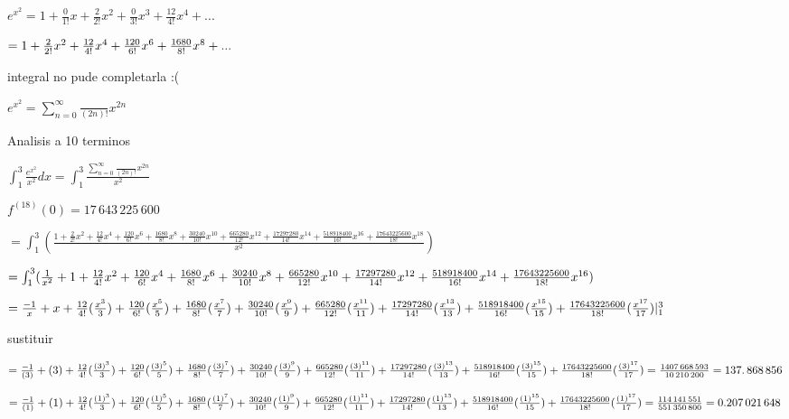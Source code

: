 \documentclass{article}
\begin{document}
$e^{x^{2}}=1+\frac{0}{1!}x+\frac{2}{2!}x^{2}+\frac{0}{3!}x^{3}+\frac{12}{4!}%
x^{4}+...$

\qquad $=1+\frac{2}{2!}x^{2}+\frac{12}{4!}x^{4}+\frac{120}{6!}x^{6}+\frac{%
1680}{8!}x^{8}+...$

integral no pude completarla :( 

$e^{x^{2}}=\sum_{n=0}^{\infty }\frac{{}}{(2n)!}x^{2n}$\newline

Analisis a 10 terminos

$\int_{1}^{3}\frac{e^{x^{2}}}{x^{2}}dx=\int_{1}^{3}\frac{\sum_{n=0}^{\infty }%
\frac{{}}{(2n)!}x^{2n}}{x^{2}}$

\bigskip $f^{(18)}(0)=\allowbreak 17\,\allowbreak 643\,225\,600$

$=\int_{1}^{3}(\frac{1+\frac{2}{2!}x^{2}+\frac{12}{4!}x^{4}+\frac{120}{6!}%
x^{6}+\frac{1680}{8!}x^{8}+\frac{30240}{10!}x^{10}+\frac{665280}{12!}x^{12}+%
\frac{17297280}{14!}x^{14}+\frac{518918400}{16!}x^{16}+\frac{17643225600}{18!%
}x^{18}}{x^{2}})$

$=\int_{1}^{3}(\frac{1}{x^{2}}+1+\frac{12}{4!}x^{2}+\frac{120}{6!}x^{4}+%
\frac{1680}{8!}x^{6}+\frac{30240}{10!}x^{8}+\frac{665280}{12!}x^{10}+\frac{%
17297280}{14!}x^{12}+\frac{518918400}{16!}x^{14}+\frac{17643225600}{18!}%
x^{16})$

$=\frac{-1}{x}+x+\frac{12}{4!}(\frac{x^{3}}{3})+\frac{120}{6!}(\frac{x^{5}}{5%
})+\frac{1680}{8!}(\frac{x^{7}}{7})+\frac{30240}{10!}(\frac{x^{9}}{9})+\frac{%
665280}{12!}(\frac{x^{11}}{11})+\frac{17297280}{14!}(\frac{x^{13}}{13})+%
\frac{518918400}{16!}(\frac{x^{15}}{15})+\frac{17643225600}{18!}(\frac{x^{17}%
}{17})|_{1}^{3}$

sustituir

$=\frac{-1}{(3)}+(3)+\frac{12}{4!}(\frac{(3)^{3}}{3})+\frac{120}{6!}(\frac{%
(3)^{5}}{5})+\frac{1680}{8!}(\frac{(3)^{7}}{7})+\frac{30240}{10!}(\frac{%
(3)^{9}}{9})+\frac{665280}{12!}(\frac{(3)^{11}}{11})+\frac{17297280}{14!}(%
\frac{(3)^{13}}{13})+\frac{518918400}{16!}(\frac{(3)^{15}}{15})+\frac{%
17643225600}{18!}(\frac{(3)^{17}}{17})=\allowbreak \frac{1407\,668\,593}{%
10\,210\,200}=\allowbreak 137.\,\allowbreak 868\,856$

$=\frac{-1}{(1)}+(1)+\frac{12}{4!}(\frac{(1)^{3}}{3})+\frac{120}{6!}(\frac{%
(1)^{5}}{5})+\frac{1680}{8!}(\frac{(1)^{7}}{7})+\frac{30240}{10!}(\frac{%
(1)^{9}}{9})+\frac{665280}{12!}(\frac{(1)^{11}}{11})+\frac{17297280}{14!}(%
\frac{(1)^{13}}{13})+\frac{518918400}{16!}(\frac{(1)^{15}}{15})+\frac{%
17643225600}{18!}(\frac{(1)^{17}}{17})=\allowbreak \frac{114\,141\,551}{%
551\,350\,800}=\allowbreak 0.207\,021\,648\,\allowbreak $
\end{document}
